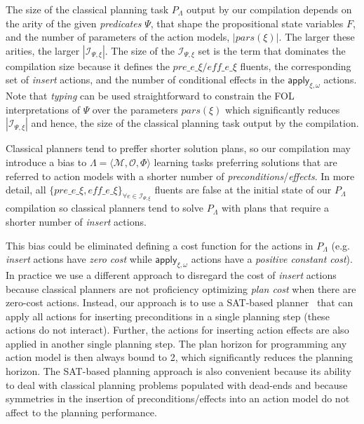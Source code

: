 \documentclass{article}
\newcommand{\tup}[1]{{\langle #1 \rangle}}
\begin{document}
The size of the classical planning task $P_{\Lambda}$ output by our compilation depends on the arity of the given {\em predicates} $\Psi$, that shape the propositional state variables $F$, and the number of parameters of the action models, $|pars(\xi)|$. The larger these arities, the larger $|{\mathcal I}_{\Psi,\xi}|$. The size of the ${\mathcal I}_{\Psi,\xi}$ set is the term that dominates the compilation size because it defines the $pre\_e\_\xi/eff\_e\_\xi$ fluents, the corresponding set of {\em insert} actions, and the number of conditional effects in the $\mathsf{apply_{\xi,\omega}}$ actions. Note that {\em typing} can be used straightforward to constrain the FOL interpretations of $\Psi$ over the parameters $pars(\xi)$ which significantly reduces $|{\mathcal I}_{\Psi,\xi}|$ and hence, the size of the classical planning task output by the compilation.

Classical planners tend to preffer shorter solution plans, so our compilation may introduce a bias to $\Lambda=\tup{\mathcal{M},{\mathcal O},\Phi}$ learning tasks preferring solutions that are referred to action models with a shorter number of {\em preconditions}/{\em effects}. In more detail, all $\{pre\_e\_\xi, eff\_e\_\xi\}_{\forall e\in{\mathcal I}_{\Psi,\xi}}$ fluents are false at the initial state of our $P_\Lambda$ compilation so classical planners tend to solve $P_\Lambda$ with plans that require a shorter number of {\em insert} actions.

This bias could be eliminated defining a cost function for the actions in $P_\Lambda$ (e.g. {\em insert} actions have {\em zero cost} while $\mathsf{apply_{\xi,\omega}}$ actions have a {\em positive constant cost}). In practice we use a different approach to disregard the cost of {\em insert} actions because classical planners are not proficiency optimizing {\em plan cost} when there are zero-cost actions. Instead, our approach is to use a SAT-based planner~\cite{rintanen2014madagascar} that can apply all actions for inserting preconditions in a single planning step (these actions do not interact). Further, the actions for inserting action effects are also applied in another single planning step. The plan horizon for programming any action model is then always bound to 2, which significantly reduces the planning horizon. The SAT-based planning approach is also convenient because its ability to deal with classical planning problems populated with dead-ends and because symmetries in the insertion of preconditions/effects into an action model do not affect to the planning performance.
\end{document}
